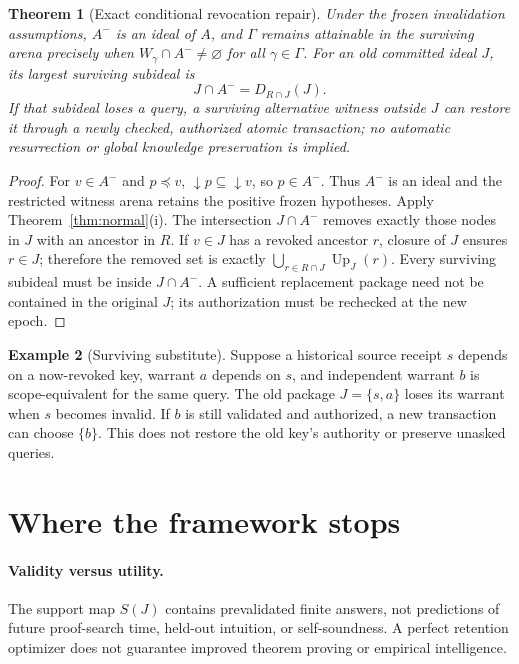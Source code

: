 \documentclass[10pt,letterpaper]{article}
\newtheorem{theorem}{Theorem}[section]
\theoremstyle{definition}
\newtheorem{example}[theorem]{Example}
\theoremstyle{remark}
\newcommand{\Up}{\operatorname{Up}}
\begin{document}
\begin{theorem}[Exact conditional revocation repair]\label{thm:revoke}
Under the frozen invalidation assumptions, $A^-$ is an ideal of $A$, and $\Gamma$ remains attainable in the surviving arena precisely when $W_\gamma\cap A^-\ne\varnothing$ for all $\gamma\in\Gamma$. For an old committed ideal $J$, its largest surviving subideal is
\[
J\cap A^-=D_{R\cap J}(J).
\]
If that subideal loses a query, a surviving alternative witness outside $J$ can restore it through a \emph{newly checked, authorized atomic transaction}; no automatic resurrection or global knowledge preservation is implied.
\end{theorem}
\begin{proof}
For $v\in A^-$ and $p\preceq v$, $\downarrow p\subseteq\downarrow v$, so $p\in A^-$. Thus $A^-$ is an ideal and the restricted witness arena retains the positive frozen hypotheses. Apply Theorem~\ref{thm:normal}(i). The intersection $J\cap A^-$ removes exactly those nodes in $J$ with an ancestor in $R$. If $v\in J$ has a revoked ancestor $r$, closure of $J$ ensures $r\in J$; therefore the removed set is exactly $\bigcup_{r\in R\cap J}\Up_J(r)$. Every surviving subideal must be inside $J\cap A^-$. A sufficient replacement package need not be contained in the original $J$; its authorization must be rechecked at the new epoch.\end{proof}

\begin{example}[Surviving substitute]
Suppose a historical source receipt $s$ depends on a now-revoked key, warrant $a$ depends on $s$, and independent warrant $b$ is scope-equivalent for the same query. The old package $J=\{s,a\}$ loses its warrant when $s$ becomes invalid. If $b$ is still validated and authorized, a new transaction can choose $\{b\}$. This does not restore the old key's authority or preserve unasked queries.
\end{example}

\section{Where the framework stops}\label{gl-first-W2-s10}
\paragraph{Validity versus utility.} The support map $S(J)$ contains prevalidated finite answers, not predictions of future proof-search time, held-out intuition, or self-soundness. A perfect retention optimizer does not guarantee improved theorem proving or empirical intelligence.
\end{document}
